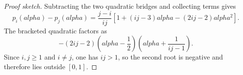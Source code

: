 \documentclass[10pt,a4paper]{amsart}
\def\alpha{alpha}%
\begin{document}
\begin{proof}[Proof sketch]
Subtracting the two quadratic bridges and collecting terms gives
\[
  p_i(\alpha)-p_j(\alpha)
  =
  \frac{j-i}{ij}
  \left[
    1+(ij-3)\alpha-(2ij-2)\alpha^2
  \right].
\]
The bracketed quadratic factors as
\[
  -(2ij-2)
  \left(\alpha-\frac{1}{2}\right)
  \left(\alpha+\frac{1}{ij-1}\right).
\]
Since $i,j\geq 1$ and $i\neq j$, one has $ij>1$, so the second root is
negative and therefore lies outside $[0,1]$.
\end{proof}
\end{document}
